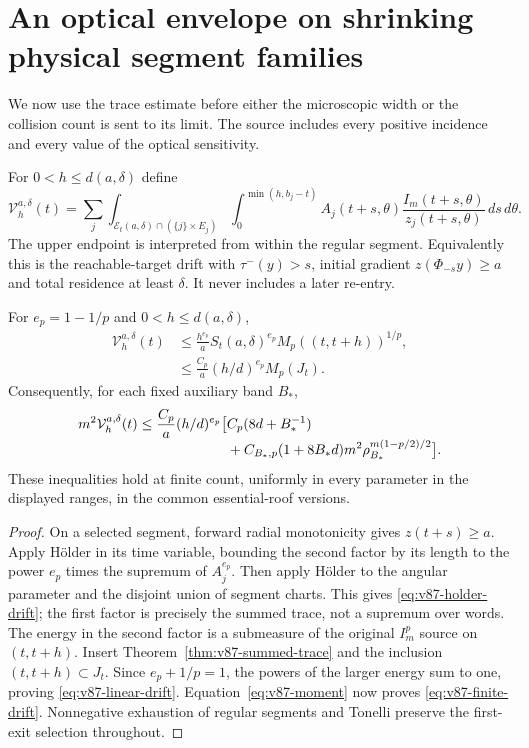 \section{An optical envelope on shrinking physical segment families}
\label{sec:v87-envelope}
We now use the trace estimate before either the microscopic width or
the collision count is sent to its limit. The source includes every
positive incidence and every value of the optical sensitivity.

For $0<h\le d(a,\delta)$ define
\begin{equation}\label{eq:v87-selected-drift}
 \mathcal V_h^{a,\delta}(t)=
  \sum_j\int_{\mathcal E_t(a,\delta)\cap(\{j\}\times E_j)}
      \int_0^{\min(h,b_j-t)}
         A_j(t+s,\theta)\frac{I_m(t+s,\theta)}{z_j(t+s,\theta)}
                                         \,ds\,d\theta.
\end{equation}
The upper endpoint is interpreted from within the regular segment.
Equivalently this is the reachable-target drift with
$\tau^-(y)>s$, initial gradient $z(\Phi_{-s}y)\ge a$ and total
residence at least $\delta$. It never includes a later re-entry.

\begin{theorem}
\label{thm:v87-trace-drift}
For $e_p=1-1/p$ and $0<h\le d(a,\delta)$,
\begin{align}
 \mathcal V_h^{a,\delta}(t)
 &\le \frac{h^{e_p}}a S_t(a,\delta)^{e_p}
                         M_p((t,t+h))^{1/p},\label{eq:v87-holder-drift}\\
 &\le \frac{C_p}a(h/d)^{e_p}M_p(J_t).
                                             \label{eq:v87-linear-drift}
\end{align}
Consequently, for each fixed auxiliary band $B_*$,
\begin{align}
 m^2\mathcal V_h^{a,\delta}(t)
 \le\frac{C_p}a(h/d)^{e_p}\bigl[&C_p(8d+B_*^{-1})\notag\\[-1mm]
 &+C_{B_*,p}(1+8B_*d)m^2
                         \rho_{B_*}^{m(1-p/2)/2}\bigr].
                                           \label{eq:v87-finite-drift}
\end{align}
These inequalities hold at finite count, uniformly in every parameter
in the displayed ranges, in the common essential-roof versions.
\end{theorem}
\begin{proof}
On a selected segment, forward radial monotonicity gives $z(t+s)\ge a$.
Apply H\"older in its time variable, bounding the second factor by
its length to the power $e_p$ times the supremum of $A_j^{e_p}$.
Then apply H\"older to the angular parameter and the disjoint union
of segment charts. This gives \eqref{eq:v87-holder-drift}; the first
factor is precisely the summed trace, not a supremum over words.
The energy in the second factor is a submeasure of the original
$I_m^p$ source on $(t,t+h)$. Insert
Theorem~\ref{thm:v87-summed-trace} and the inclusion
$(t,t+h)\subset J_t$. Since $e_p+1/p=1$, the powers of the larger
energy sum to one, proving \eqref{eq:v87-linear-drift}.
Equation~\eqref{eq:v87-moment} now proves
\eqref{eq:v87-finite-drift}. Nonnegative exhaustion of regular
segments and Tonelli preserve the first-exit selection throughout.
\end{proof}

